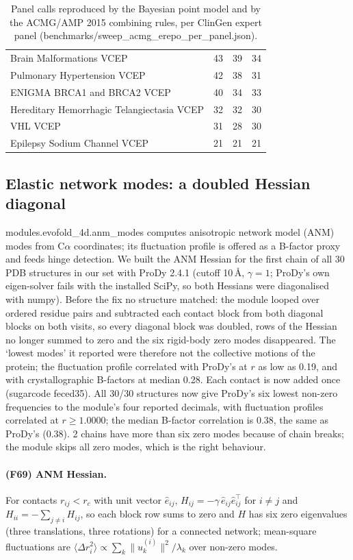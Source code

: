 \begin{table}[p]
\begin{tabular}{lrrr}
Brain Malformations VCEP & 43 & 39 & 34\\
Pulmonary Hypertension VCEP & 42 & 38 & 31\\
ENIGMA BRCA1 and BRCA2 VCEP & 40 & 34 & 33\\
Hereditary Hemorrhagic Telangiectasia VCEP & 32 & 32 & 30\\
VHL VCEP & 31 & 28 & 30\\
Epilepsy Sodium Channel VCEP & 21 & 21 & 21\\
\hline\end{tabular}\caption{Panel calls reproduced by the Bayesian point model and by the ACMG/AMP 2015 combining rules, per ClinGen expert panel (benchmarks/sweep\_acmg\_erepo\_per\_panel.json).}\label{tab:vcep}\end{table}
\subsection{Elastic network modes: a doubled Hessian diagonal}
modules.evofold\_4d.anm\_modes computes anisotropic network model (ANM) modes from C$\alpha$ coordinates; its fluctuation profile is offered as a B-factor proxy and feeds hinge detection. We built the ANM Hessian for the first chain of all 30 PDB structures in our set with ProDy 2.4.1 (cutoff 10\,\AA, $\gamma=1$; ProDy's own eigen-solver fails with the installed SciPy, so both Hessians were diagonalised with numpy). Before the fix no structure matched: the module looped over ordered residue pairs and subtracted each contact block from both diagonal blocks on both visits, so every diagonal block was doubled, rows of the Hessian no longer summed to zero and the six rigid-body zero modes disappeared. The `lowest modes' it reported were therefore not the collective motions of the protein; the fluctuation profile correlated with ProDy's at $r$ as low as 0.19, and with crystallographic B-factors at median 0.28. Each contact is now added once (sugarcode feced35). All 30/30 structures now give ProDy's six lowest non-zero frequencies to the module's four reported decimals, with fluctuation profiles correlated at $r\ge1.0000$; the median B-factor correlation is 0.38, the same as ProDy's (0.38). 2 chains have more than six zero modes because of chain breaks; the module skips all zero modes, which is the right behaviour.
\paragraph{(F69) ANM Hessian.} For contacts $r_{ij}<r_c$ with unit vector $\hat e_{ij}$, $H_{ij}=-\gamma\,\hat e_{ij}\hat e_{ij}^{\top}$ for $i\ne j$ and $H_{ii}=-\sum_{j\ne i}H_{ij}$, so each block row sums to zero and $H$ has six zero eigenvalues (three translations, three rotations) for a connected network; mean-square fluctuations are $\langle\Delta r_i^2\rangle\propto\sum_{k}\lVert u_k^{(i)}\rVert^2/\lambda_k$ over non-zero modes.
